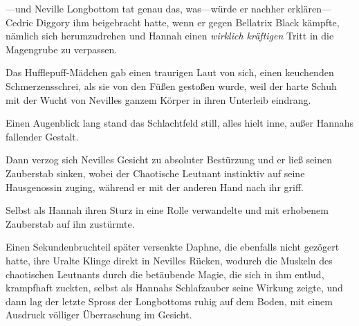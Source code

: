 —und Neville Longbottom tat genau das, was—würde er nachher erklären—Cedric Diggory ihm beigebracht hatte, wenn er gegen Bellatrix Black kämpfte, nämlich sich herumzudrehen und Hannah einen \emph{wirklich kräftigen} Tritt in die Magengrube zu verpassen.

Das Hufflepuff-Mädchen gab einen traurigen Laut von sich, einen keuchenden Schmerzensschrei, als sie von den Füßen gestoßen wurde, weil der harte Schuh mit der Wucht von Nevilles ganzem Körper in ihren Unterleib eindrang.

Einen Augenblick lang stand das Schlachtfeld still, alles hielt inne, außer Hannahs fallender Gestalt.

Dann verzog sich Nevilles Gesicht zu absoluter Bestürzung und er ließ seinen Zauberstab sinken, wobei der Chaotische Leutnant instinktiv auf seine Hausgenossin zuging, während er mit der anderen Hand nach ihr griff.

Selbst als Hannah ihren Sturz in eine Rolle verwandelte und mit erhobenem Zauberstab auf ihn zustürmte.

Einen Sekundenbruchteil später versenkte Daphne, die ebenfalls nicht gezögert hatte, ihre Uralte Klinge direkt in Nevilles Rücken, wodurch die Muskeln des chaotischen Leutnants durch die betäubende Magie, die sich in ihm entlud, krampfhaft zuckten, selbst als Hannahs Schlafzauber seine Wirkung zeigte, und dann lag der letzte Spross der Longbottoms ruhig auf dem Boden, mit einem Ausdruck völliger Überraschung im Gesicht.


